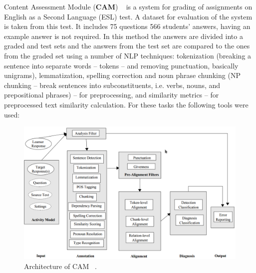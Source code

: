 \documentclass[11pt]{report}
\numberwithin{equation}{section} %
\begin{document}
Content Assessment Module (\textbf{CAM}) ~\cite{CAM} is a system for grading of assignments on  English as a Second Language (ESL) test. A dataset for evaluation of the system is taken from this test. It includes 75 questions 566 students' answers, having an example answer is not required. In this method the answers are divided into a graded and test sets and the answers from the test set are compared to the ones from the graded set using a number of NLP techniques: tokenization (breaking a sentence into separate words -- tokens -- and removing punctuation, basically unigrams), lemmatization, spelling correction and noun phrase chunking (NP chunking -- break sentences into subconstituents, i.e. verbs, nouns, and prepositional phrases) -- for preprocessing, and similarity metrics -- for preprocessed text similarity calculation. For these tasks the following tools were used:


\begin{figure}[h!]
  \centering
  \includegraphics[width=\textwidth]{img/CAM}
    \caption{ Architecture of CAM ~\cite{CAM}. }\label{fig:CAM}
\end{figure}
\end{document}
